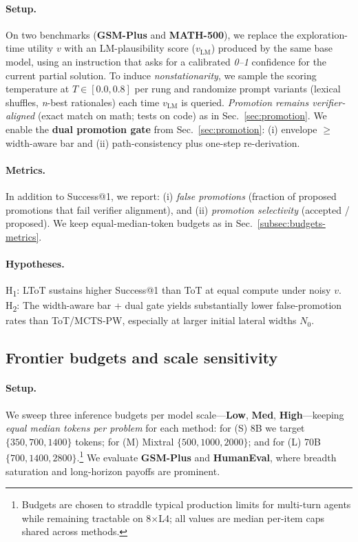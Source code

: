 \documentclass{article}
\begin{document}
\paragraph{Setup.}
On two benchmarks (\textbf{GSM-Plus} and \textbf{MATH-500}), we replace the exploration-time utility $v$ with an LM-plausibility score ($v_{\text{LM}}$) produced by the same base model, using an instruction that asks for a calibrated \emph{0--1} confidence for the current partial solution.
To induce \emph{nonstationarity}, we sample the scoring temperature at $T{\in}[0.0,0.8]$ per rung and randomize prompt variants (lexical shuffles, \emph{n}-best rationales) each time $v_{\text{LM}}$ is queried.
\emph{Promotion remains verifier-aligned} (exact match on math; tests on code) as in Sec.~\ref{sec:promotion}.
We enable the \textbf{dual promotion gate} from Sec.~\ref{sec:promotion}: (i) envelope $\ge$ width-aware bar and (ii) path-consistency plus one-step re-derivation.

\paragraph{Metrics.}
In addition to Success@1, we report: (i) \emph{false promotions} (fraction of proposed promotions that fail verifier alignment), and (ii) \emph{promotion selectivity} (accepted / proposed).
We keep equal-median-token budgets as in Sec.~\ref{subsec:budgets-metrics}.

\paragraph{Hypotheses.}
H\textsubscript{1}: LToT sustains higher Success@1 than ToT at equal compute under noisy $v$.
H\textsubscript{2}: The width-aware bar + dual gate yields substantially lower false-promotion rates than ToT/MCTS-PW, especially at larger initial lateral widths $N_0$.


\subsection{Frontier budgets and scale sensitivity}
\label{subsec:frontier-budgets}

\paragraph{Setup.}
We sweep three inference budgets per model scale—\textbf{Low}, \textbf{Med}, \textbf{High}—keeping \emph{equal median tokens per problem} for each method:
for (S) 8B we target $\{350,700,1400\}$ tokens; for (M) Mixtral $\{500,1000,2000\}$; and for (L) 70B $\{700,1400,2800\}$.\footnote{Budgets are chosen to straddle typical production limits for multi-turn agents while remaining tractable on 8$\times$L4; all values are median per-item caps shared across methods.}
We evaluate \textbf{GSM-Plus} and \textbf{HumanEval}, where breadth saturation and long-horizon payoffs are prominent.
\end{document}
